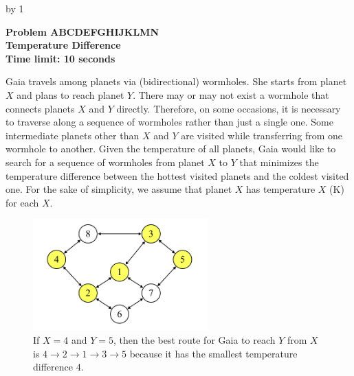 \documentclass[a4paper,12pt]{article}
\begin{document}
\parindent=24pt
\everymath{\displaystyle}

\def\Letter#1{\ifcase #1\or A\or B\or C\or D\or E\or F\or G\or H\or I\or J\or K\or L\or M\or N\fi}
\def\letter#1{\ifcase #1\or a\or b\or c\or d\or e\or f\or g\or h\or i\or j\or k\or l\or m\or n\fi}

\newcount\n
\def\problem#1#2{%
\vfill \newpage
\advance\n by 1
\begin{center}
{\LARGE\bf Problem \Letter\n\quad}\\
\medskip
{\Large\bf #1}\\
\medskip
{\large\bf Time limit: #2 seconds}
\end{center}
\bigskip
}


\problem{Temperature Difference}{10}

Gaia travels among planets via (bidirectional) wormholes. She starts from planet $X$ and plans to reach planet $Y$. There may or may not exist a wormhole that connects planets $X$ and $Y$ directly. Therefore, on some occasions, it is necessary to traverse along a sequence of wormholes rather than just a single one. Some intermediate planets other than $X$ and $Y$ are visited while transferring from one wormhole to another. Given the temperature of all planets, Gaia would like to search for a sequence of wormholes from planet $X$ to $Y$ that minimizes the temperature difference between the hottest visited planets and the coldest visited one. For the sake of simplicity, we assume that planet $X$ has temperature $X$ (K) for each $X$. 

\begin{figure}[!h]
\centering
\includegraphics[width=0.6\textwidth]{fig1.png}
\caption{If $X = 4$ and $Y = 5$, then the best route for Gaia to reach $Y$ from $X$ is $4 \rightarrow 2 \rightarrow 1 \rightarrow 3 \rightarrow 5$ because it has the smallest temperature difference $4$. \label{fig:drawing}}
\end{figure}
\end{document}
